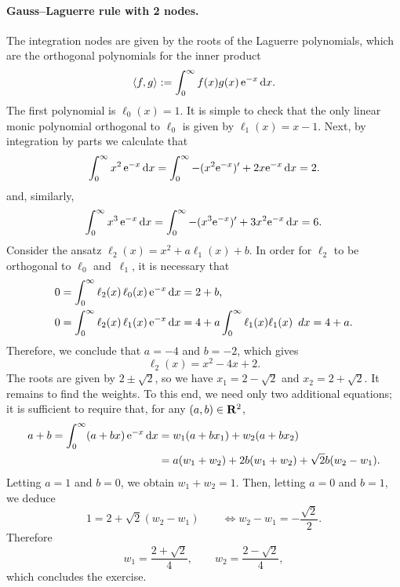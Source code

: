 \begin{solution}
    \paragraph{Gauss--Laguerre rule with 2 nodes.}
    The integration nodes are given by the roots of the Laguerre polynomials,
    which are the orthogonal polynomials for the inner product
    \[
        \langle f, g\rangle :=
        \int_{0}^{\infty} f(x) g(x) \, \mathrm e^{-x} \, \mathrm d x.
    \]
    The first polynomial is $\ell_0(x) = 1$.
    It is simple to check that the only linear monic polynomial orthogonal to $\ell_0$ is given by $\ell_1(x) = x - 1$.
    Next, by integration by parts we calculate that
    \[
        \int_{0}^{\infty} x^2 \, \mathrm e^{-x} \, \mathrm d x 
        = \int_{0}^{\infty} - (x^2 \mathrm e^{-x})' + 2 x \mathrm e^{-x} \, \mathrm d x = 2.
    \]
    and, similarly,
    \[
        \int_{0}^{\infty} x^3 \, \mathrm e^{-x} \, \mathrm d x 
        = \int_{0}^{\infty} - (x^3 \mathrm e^{-x})' + 3 x^2 \mathrm e^{-x} \, \mathrm d x = 6.
    \]
    Consider the ansatz $\ell_2(x) = x^2 + a \ell_1(x) + b$.
    In order for $\ell_2$ to be orthogonal to $\ell_0$ and~$\ell_1$,
    it is necessary that
    \begin{align*}
        0 &= \int_{0}^{\infty} \ell_{2}(x) \, \ell_0(x) \, \mathrm e^{-x} \, \mathrm d x = 2 + b, \\
        0 &= \int_{0}^{\infty} \ell_{2}(x) \, \ell_1(x) \, \mathrm e^{-x} \, \mathrm d x 
        = 4 + a \int_{0}^{\infty} \ell_1(x) \ell_1(x) \, \ d x = 4 + a.
    \end{align*}
    Therefore, we conclude that $a = -4$ and $b=-2$,
    which gives
    \[
        \ell_2(x) = x^2 - 4 x + 2.
    \]
    The roots are given by $2 \pm \sqrt{2}$,
    so we have $x_1 = 2 - \sqrt{2}$ and $x_2 = 2 + \sqrt{2}$.
    It remains to find the weights.
    To this end, we need only two additional equations;
    it is sufficient to require that, for any $(a,b) \in \mathbf R^2$,
    \begin{align*}
        a + b = 
            \int_{0}^{\infty} (a + bx) \, \mathrm e^{-x} \, \mathrm d x 
    &= w_1 (a + b x_1) + w_2 (a + b x_2) \\
    &= a (w_1 + w_2) + 2 b (w_1 + w_2) + \sqrt{2} b (w_2 - w_1).
    \end{align*}
    Letting $a = 1$ and $b = 0$,
    we obtain $w_1 + w_2 = 1$.
    Then, letting $a = 0$ and $b = 1$,
    we deduce
    \[
        1 = 2 + \sqrt{2} (w_2 - w_1) \qquad \Leftrightarrow w_2 - w_1 = - \frac{\sqrt{2}}{2}.
    \]
    Therefore
    \[
        w_1 = \frac{2 + \sqrt{2}}{4}, \qquad w_2 = \frac{2 - \sqrt{2}}{4},
    \]
    which concludes the exercise.
\end{solution}

